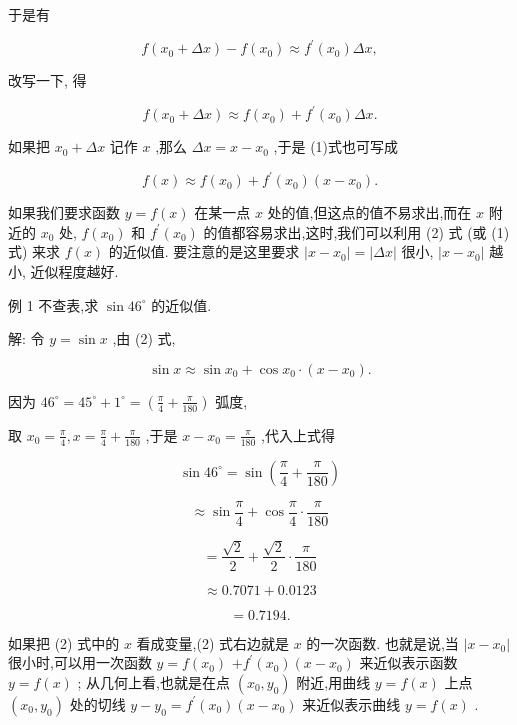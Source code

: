 \documentclass[lang=cn,newtx,10pt,scheme=chinese]{elegantbook}
\begin{document}
于是有

\[
f\left( {{x}_{0} + {\Delta x}}\right) - f\left( {x}_{0}\right) \approx {f}^{\prime }\left( {x}_{0}\right) {\Delta x},
\]

改写一下, 得

\[
f\left( {{x}_{0} + {\Delta x}}\right) \approx f\left( {x}_{0}\right) + {f}^{\prime }\left( {x}_{0}\right) {\Delta x}. \tag{1}
\]

如果把 \({x}_{0} + {\Delta x}\) 记作 \(x\) ,那么 \({\Delta x} = x - {x}_{0}\) ,于是 (1)式也可写成

\[
f\left( x\right) \approx f\left( {x}_{0}\right) + {f}^{\prime }\left( {x}_{0}\right) \left( {x - {x}_{0}}\right) . \tag{2}
\]

如果我们要求函数 \(y = f\left( x\right)\) 在某一点 \(x\) 处的值,但这点的值不易求出,而在 \(x\) 附近的 \({x}_{0}\) 处, \(f\left( {x}_{0}\right)\) 和 \({f}^{\prime }\left( {x}_{0}\right)\) 的值都容易求出,这时,我们可以利用 (2) 式 (或 (1) 式) 来求 \(f\left( x\right)\) 的近似值. 要注意的是这里要求 \(\left| {x - {x}_{0}}\right| = \left| {\Delta x}\right|\) 很小, \(\left| {x - {x}_{0}}\right|\) 越小, 近似程度越好.

例 1 不查表,求 \(\sin {46}^{ \circ }\) 的近似值.

解: 令 \(y = \sin x\) ,由 (2) 式,

\[
\sin x \approx \sin {x}_{0} + \cos {x}_{0} \cdot \left( {x - {x}_{0}}\right) .
\]

因为 \({46}^{ \circ } = {45}^{ \circ } + {1}^{ \circ } = \left( {\frac{\pi }{4} + \frac{\pi }{180}}\right)\) 弧度,

取 \({x}_{0} = \frac{\pi }{4},x = \frac{\pi }{4} + \frac{\pi }{180}\) ,于是 \(x - {x}_{0} = \frac{\pi }{180}\) ,代入上式得

\[
\sin {46}^{ \circ } = \sin \left( {\frac{\pi }{4} + \frac{\pi }{180}}\right)
\]

\[
\approx \sin \frac{\pi }{4} + \cos \frac{\pi }{4} \cdot \frac{\pi }{180}
\]

\[
= \frac{\sqrt{2}}{2} + \frac{\sqrt{2}}{2} \cdot \frac{\pi }{180}
\]

\[
\approx {0.7071} + {0.0123}
\]

\[
= {0.7194}\text{.}
\]

如果把 (2) 式中的 \(x\) 看成变量,(2) 式右边就是 \(x\) 的一次函数. 也就是说,当 \(\left| {x - {x}_{0}}\right|\) 很小时,可以用一次函数 \(y = f\left( {x}_{0}\right)\) \(+ {f}^{\prime }\left( {x}_{0}\right) \left( {x - {x}_{0}}\right)\) 来近似表示函数 \(y = f\left( x\right)\) ; 从几何上看,也就是在点 \(\left( {{x}_{0},{y}_{0}}\right)\) 附近,用曲线 \(y = f\left( x\right)\) 上点 \(\left( {{x}_{0},{y}_{0}}\right)\) 处的切线 \(y - {y}_{0} = {f}^{\prime }\left( {x}_{0}\right) \left( {x - {x}_{0}}\right)\) 来近似表示曲线 \(y = f\left( x\right)\) .
\end{document}
